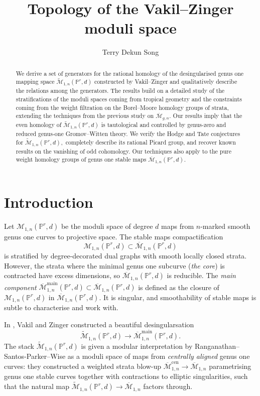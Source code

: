 \documentclass[12pt,reqno]{amsart}
\title{Topology of the Vakil--Zinger moduli space}
\author[T. Song]{Terry Dekun Song}\address{Department of Pure Mathematics and Mathematical Statistics, University of Cambridge, Cambridge, CB3 0WA}\email{\url{ds2016@cam.ac.uk}}
\theoremstyle{definition}
\theoremstyle{definition}
\theoremstyle{definition}
\theoremstyle{definition}
\newcommand{\ol}[1]{\overline{#1}}
\newcommand{\PP}{\mathbb{P}}
\newcommand{\Mcal}{\mathcal{M}}
\newcommand{\Mbar}{\ol{\Mcal}}
\newcommand{\Mtil}{\widetilde{\mathcal{M}}}
\begin{document}
\begin{abstract}
  We derive a set of generators for the rational homology of the desingularised genus one mapping space $\Mtil_{1,n}(\mathbb{P}^r,d)$ constructed by Vakil--Zinger and qualitatively describe the relations among the generators. The results build on a detailed study of the stratifications of the moduli spaces coming from tropical geometry and the constraints coming from the weight filtration on the Borel--Moore homology groups of strata, extending the techniques from the previous study on $\Mbar_{g,n}.$ Our results imply that the even homology of $\Mtil_{1,n}(\mathbb{P}^r,d)$ is tautological and controlled by genus-zero and reduced genus-one Gromov--Witten theory. We verify the Hodge and Tate conjectures for $\Mtil_{1,n}(\mathbb{P}^r,d),$ completely describe its rational Picard group, and recover known results on the vanishing of odd cohomology. Our techniques also apply to the pure weight homology groups of genus one stable maps $\Mbar_{1,n}(\PP^r,d).$
\end{abstract}
\maketitle
\setcounter{tocdepth}{1}
\tableofcontents
\section{Introduction}
Let $\mathcal{M}_{1,n}(\mathbb{P}^r,d)$ be the moduli space of degree $d$ maps from $n$-marked smooth genus one curves to projective space. The stable maps compactification $$\mathcal{M}_{1,n}(\mathbb{P}^r,d)\subset \Mbar_{1,n}(\mathbb{P}^r,d)$$ is stratified by degree-decorated dual graphs with smooth locally closed strata. However, the strata where the minimal genus one subcurve (\emph{the core}) is contracted have excess dimensions, so $\Mbar_{1,n}(\mathbb{P}^r,d)$ is reducible. The \emph{main component} $\Mbar^{\mathrm{main}}_{1,n}(\mathbb{P}^r,d)\subset \Mbar_{1,n}(\PP^r,d)$ is defined as the closure of $\mathcal{M}_{1,n}(\mathbb{P}^r,d)$ in $ \Mbar_{1,n}(\mathbb{P}^r,d).$ It is singular, and smoothability of stable maps is subtle to characterise and work with.

In \cite{vakilzinger}, Vakil and Zinger constructed a beautiful desingularsation $$\Mtil_{1,n}(\PP^r,d)\to \Mbar_{1,n}^{\mathrm{main}}(\PP^r,d).$$ The stack $\Mtil_{1,n}(\PP^r,d)$ is given a modular interpretation by Ranganathan--Santos-Parker--Wise \cite{rspw} as a moduli space of maps from \emph{centrally aligned} genus one curves: they constructed a weighted strata blow-up $\Mbar_{1,n}^{\mathrm{cen}}\to \Mbar_{1,n}$ parametrising genus one stable curves together with contractions to elliptic singularities, such that the natural map $\Mtil_{1,n}(\PP^r,d)\to \Mbar_{1,n}$ factors through.
\end{document}
